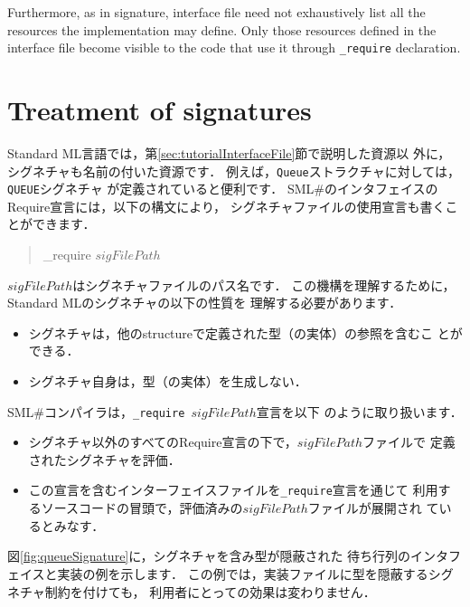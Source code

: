 \documentclass{jbook}
\newcommand{\txt}[2]{#2}
\newcommand{\smlsharp}{SML\#}
\newenvironment{program}{\begin{tt}\begin{quote}}{\end{quote}\end{tt}}
\begin{document}
	Furthermore, as in signature, interface file need not
exhaustively list all the resources the implementation may define.
	Only those resources defined in the interface file become
visible to the code that use it through {\tt \_require} declaration.
\fi%

\section{\txt{シグネチャの扱い}{Treatment of signatures}}
\label{sec:tutorialSignatureInInterface}

\ifx\jp%
	Standard ML言語では，第\ref{sec:tutorialInterfaceFile}節で説明した資源以
外に，シグネチャも名前の付いた資源です．
	例えば，{\tt Queue}ストラクチャに対しては，{\tt QUEUE}シグネチャ
が定義されていると便利です．
	\smlsharp{}のインタフェイスのRequire宣言には，以下の構文により，
シグネチャファイルの使用宣言も書くことができます．
\begin{program}
\_require $sigFilePath$
\end{program}
	$sigFilePath$はシグネチャファイルのパス名です．
	この機構を理解するために，Standard MLのシグネチャの以下の性質を
理解する必要があります．
\begin{itemize}
\item シグネチャは，他のstructureで定義された型（の実体）の参照を含むこ
とができる．
\item シグネチャ自身は，型（の実体）を生成しない．
\end{itemize}
	\smlsharp{}コンパイラは，{\tt \_require $sigFilePath$}宣言を以下
のように取り扱います．
\begin{itemize}
\item シグネチャ以外のすべてのRequire宣言の下で，$sigFilePath$ファイルで
定義されたシグネチャを評価．
\item この宣言を含むインターフェイスファイルを{\tt \_require}宣言を通じて
利用するソースコードの冒頭で，評価済みの$sigFilePath$ファイルが展開され
ているとみなす．
\end{itemize}
	図\ref{fig:queueSignature}に，シグネチャを含み型が隠蔽された
待ち行列のインタフェイスと実装の例を示します．
	この例では，実装ファイルに型を隠蔽するシグネチャ制約を付けても，
利用者にとっての効果は変わりません．
\end{document}
